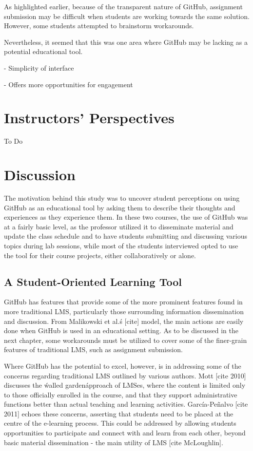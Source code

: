 As highlighted earlier, because of the transparent nature of GitHub, assignment submission may be difficult when students are working towards the same solution. %
However, some students attempted to brainstorm workarounds. %

Nevertheless, it seemed that this was one area where GitHub may be lacking as a potential educational tool.

- Simplicity of interface

- Offers more opportunities for engagement

\section{Instructors' Perspectives}
To Do

\section{Discussion}
The motivation behind this study was to uncover student perceptions on using GitHub as an educational tool by asking them to describe their thoughts and experiences as they experience them. In these two courses, the use of GitHub was at a fairly basic level, as the professor utilized it to disseminate material and update the class schedule and to have students submitting and discussing various topics during lab sessions, while most of the students interviewed opted to use the tool for their course projects, either collaboratively or alone.

\subsection{A Student-Oriented Learning Tool}
GitHub has features that provide some of the more prominent features found in more traditional LMS, particularly those surrounding information dissemination and discussion. From Malikowski et al.\'s [cite] model, the main actions are easily done when GitHub is used in an educational setting. As to be discussed in the next chapter, some workarounds must be utilized to cover some of the finer-grain features of traditional LMS, such as assignment submission.

Where GitHub has the potential to excel, however, is in addressing some of the concerns regarding traditional LMS outlined by various authors. Mott [cite 2010] discusses the \'walled garden\' approach of LMSes, where the content is limited only to those officially enrolled in the course, and that they support administrative functions better than actual teaching and learning activities. García-Peñalvo [cite 2011] echoes these concerns, asserting that students need to be placed at the centre of the e-learning process. This could be addressed by allowing students opportunities to participate and connect with and learn from each other, beyond basic material dissemination - the main utility of LMS [cite McLoughlin].

